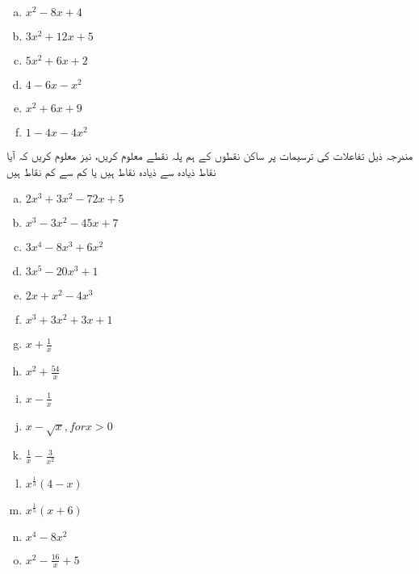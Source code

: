 \begin{multicols}{3}
\begin{enumerate}[a.]
\item \(  x^{2}-8x+4 \hspace{50pt}   \)
\item \( 3x^{2}+12x+5 \hspace{50pt}   \)
\item  \( 5x^{2}+6x+2   \)
\item  \( 4-6x-x^{2} \hspace{50pt}    \)
\item  \( x^{2}+6x+9 \hspace{50pt}    \)
\item \(  1-4x-4x^{2}  \)
\end{enumerate}
\end{multicols}
مندرجہ ذیل تفاعلات کی ترسیمات پر ساکن نقطوں کے ہم پلہ نقطے معلوم کریں، نیز معلوم کریں کہ آیا نقاط ذیادہ سے ذیادہ نقاط ہیں یا کم سے کم نقاط ہیں
\begin{multicols}{3}
\begin{enumerate}[a.]
\item \( 2x^{3}+3x^{2}-72x+5 \hspace{20pt}   \)
\item \(  x^{3}-3x^{2}-45x+7 \hspace{20pt}  \)
\item  \(3x^{4}-8x^{3}+6x^{2}    \)
\item  \( 3x^{5}-20x^{3}+1 \hspace{20pt}    \)
\item  \( 2x+x^{2}-4x^{3} \hspace{20pt}   \)
\item \( x^{3}+3x^{2}+3x+1   \)
\item \( x+\frac{1}{x} \hspace{20pt}   \)
\item \( x^{2}+\frac{54}{x} \hspace{20pt}   \)
\item  \( x-\frac{1}{x}   \)
\item  \(x-\sqrt{x},for x>0 \hspace{20pt}\)
\item  \(\frac{1}{x}-\frac{3}{x^{2}} \hspace{20pt}    \)
\item \(  x^{\frac{1}{3}}(4-x) \hspace{20pt}  \) 
\item  \( x^{\frac{1}{5}}(x+6) \hspace{20pt}   \)
\item  \(x^{4}-8x^{2}     \)
\item \(   x^{2}-\frac{16}{x}+5 \)
\end{enumerate}
\end{multicols}
